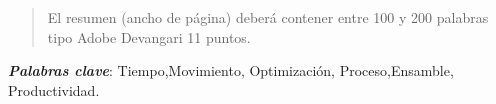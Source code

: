     \maketitle
    \thispagestyle{fancy}
    
    
    
    \begin{abstract}
    \noindent 
    El resumen (ancho de página) deberá contener entre 100 y 200 palabras tipo Adobe Devangari 11 puntos.
    
    \end{abstract}
    \textbf{\textit{Palabras clave}}:
    Tiempo,Movimiento, Optimización, Proceso,Ensamble, Productividad.
          
    

